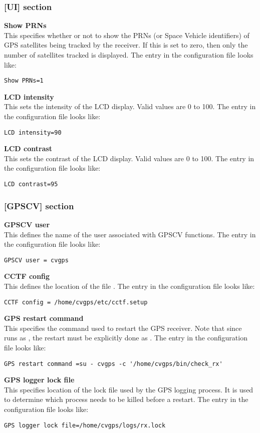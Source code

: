 \subsubsection{[UI] section}
{\bfseries Show PRNs}\\
This specifies whether or not to show the PRNs (or Space Vehicle identifiers) of
GPS satellites being tracked by the receiver. If this is set to zero, then only
the number of satellites tracked is displayed.
The entry in the configuration file looks like:
\begin{lstlisting}
Show PRNs=1
\end{lstlisting}
{\bfseries LCD intensity}\\
This sets the intensity of the LCD display. Valid values are 0 to 100.
The entry in the configuration file looks like:
\begin{lstlisting}
LCD intensity=90
\end{lstlisting}
{\bfseries LCD contrast}\\
This sets the contrast of the LCD display. Valid values are 0 to 100.
The entry in the configuration file looks like:
\begin{lstlisting}
LCD contrast=95
\end{lstlisting}

\subsubsection{[GPSCV] section}
{\bfseries GPSCV user}\\
This  defines the name of the user associated with GPSCV functions.
The entry in the configuration file looks like:
\begin{lstlisting}
GPSCV user = cvgps
\end{lstlisting}
{\bfseries CCTF config}\\
This defines the location of the file .
The entry in the configuration file looks like:
\begin{lstlisting}
CCTF config = /home/cvgps/etc/cctf.setup
\end{lstlisting}
{\bfseries GPS restart command}\\
This specifies the command used to restart the GPS receiver. Note that since
 runs as , the restart must be explicitly done
as .
The entry in the configuration file looks like:
\begin{lstlisting}
GPS restart command =su - cvgps -c '/home/cvgps/bin/check_rx'
\end{lstlisting}
{\bfseries GPS logger lock file}\\
This specifies location of the lock file used by the GPS logging process. It is
used to determine which process needs to be killed before a restart.
The entry in the configuration file looks like:
\begin{lstlisting}
GPS logger lock file=/home/cvgps/logs/rx.lock
\end{lstlisting}

